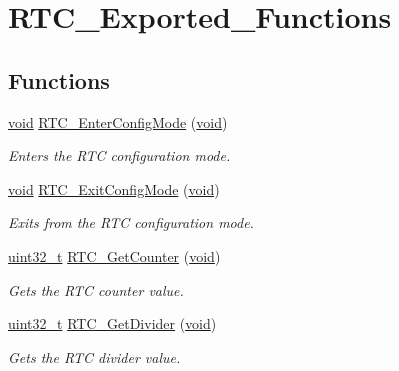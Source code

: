 \hypertarget{group___r_t_c___exported___functions}{}\section{R\+T\+C\+\_\+\+Exported\+\_\+\+Functions}
\label{group___r_t_c___exported___functions}
\subsection*{Functions}
\begin{DoxyCompactItemize}
\item 
\hyperlink{usb__devapi_8h_afabf60e7f57651d6d595a02c75f07cd0}{void} \hyperlink{group___r_t_c___exported___functions_ga23612d9da2fe057a0cd72c684e5b438a}{R\+T\+C\+\_\+\+Enter\+Config\+Mode} (\hyperlink{usb__devapi_8h_afabf60e7f57651d6d595a02c75f07cd0}{void})
\begin{DoxyCompactList}\small\item\em Enters the R\+TC configuration mode. \end{DoxyCompactList}\item 
\hyperlink{usb__devapi_8h_afabf60e7f57651d6d595a02c75f07cd0}{void} \hyperlink{group___r_t_c___exported___functions_ga7585aa6e2dbb497173b2fd03bac0d304}{R\+T\+C\+\_\+\+Exit\+Config\+Mode} (\hyperlink{usb__devapi_8h_afabf60e7f57651d6d595a02c75f07cd0}{void})
\begin{DoxyCompactList}\small\item\em Exits from the R\+TC configuration mode. \end{DoxyCompactList}\item 
\hyperlink{_p_e___types_8h_a33594304e786b158f3fb30289278f5af}{uint32\+\_\+t} \hyperlink{group___r_t_c___exported___functions_ga6edb19a0ad8414a40610341121c5ea6c}{R\+T\+C\+\_\+\+Get\+Counter} (\hyperlink{usb__devapi_8h_afabf60e7f57651d6d595a02c75f07cd0}{void})
\begin{DoxyCompactList}\small\item\em Gets the R\+TC counter value. \end{DoxyCompactList}\item 
\hyperlink{_p_e___types_8h_a33594304e786b158f3fb30289278f5af}{uint32\+\_\+t} \hyperlink{group___r_t_c___exported___functions_gaa4f00e0469fedcf6cbf23760e6d801ed}{R\+T\+C\+\_\+\+Get\+Divider} (\hyperlink{usb__devapi_8h_afabf60e7f57651d6d595a02c75f07cd0}{void})
\begin{DoxyCompactList}\small\item\em Gets the R\+TC divider value. \end{DoxyCompactList}\item 

\end{DoxyCompactItemize}
